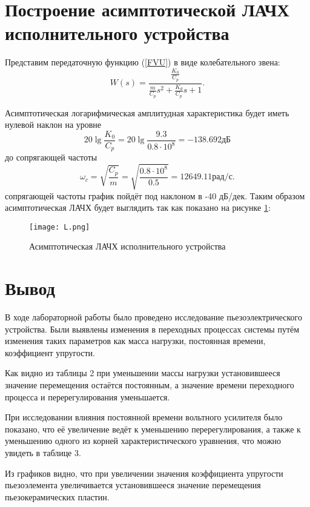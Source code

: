 \documentclass[12pt,a4paper]{article}
\begin{document}
\newpage
\section{Построение асимптотической ЛАЧХ исполнительного устройства}
Представим передаточную функцию (\ref{FVU}) в виде колебательного звена:
\begin{equation} 
    W(s) = \frac{\displaystyle{\frac{K_0}{C_p}}}{\displaystyle{\frac{m}{C_p}}s^2 + \frac{K_d}{C_p}s + 1}.
\end{equation}

Асимптотическая логарифмическая амплитудная характеристика будет иметь нулевой наклон на уровне 
\begin{equation} 
   20\lg\displaystyle{\frac{K_0}{C_p}} = 20\lg \displaystyle{\frac{9.3}{0.8\cdot10^8}} = -138.692 \text{дБ}
\end{equation}
до сопрягающей частоты 
\begin{equation} 
	\omega_c = \sqrt{\displaystyle{\frac{C_p}{m}}} = \sqrt{\displaystyle{\frac{0.8\cdot10^8}{0.5}}} = 12649.11 \text{рад/с}.
\end{equation}
 сопрягающей частоты график пойдёт под наклоном в -40 дБ/дек. Таким образом асимптотическая ЛАЧХ будет выглядить так как показано на рисунке \ref{L}:
\begin{figure}[H]
	\centering
	\texttt{[image: L.png]}
	\caption{Асимптотическая ЛАЧХ исполнительного устройства}
	\label{L}
\end{figure}

\newpage
\section*{Вывод}
В ходе лабораторной работы было проведено исследование пьезоэлектрического устройства. 
Были выявлены изменения в переходных процессах системы путём изменения таких параметров как масса нагрузки, постоянная времени, коэффициент упругости.\par
Как видно из таблицы 2 при уменьшении массы нагрузки установившееся значение перемещения остаётся постоянным, а значение времени переходного процесса и перерегулирования уменьшается. \par
При исследовании влияния постоянной времени вольтного усилителя было показано, что её увеличение ведёт к уменьшению перерегулирования, а также к уменьшению одного из корней характеристического уравнения, что можно увидеть в таблице 3.\par
Из графиков видно, что при увеличении значения коэффициента упругости пьезоэлемента увеличивается установившееся значение перемещения пьезокерамических пластин.
\end{document}
